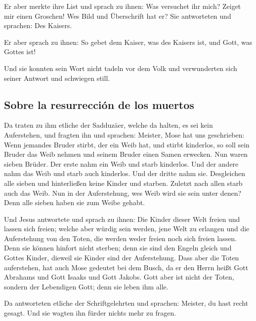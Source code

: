  Er aber merkte ihre List und sprach zu ihnen: Was
versuchet ihr mich?  Zeiget mir einen Groschen! Wes Bild
und Überschrift hat er? Sie antworteten und sprachen: Des Kaisers.

 Er aber sprach zu ihnen: So gebet dem Kaiser, was des
Kaisers ist, und Gott, was Gottes ist!

 Und sie konnten sein Wort nicht tadeln vor dem Volk und
verwunderten sich seiner Antwort und schwiegen still.

\hypertarget{sobre-la-resurrecciuxf3n-de-los-muertos}{%
\subsection{Sobre la resurrección de los
muertos}\label{sobre-la-resurrecciuxf3n-de-los-muertos}}

 Da traten zu ihm etliche der Sadduzäer, welche da
halten, es sei kein Auferstehen, und fragten ihn  und
sprachen: Meister, Mose hat uns geschrieben: Wenn jemandes Bruder
stirbt, der ein Weib hat, und stirbt kinderlos, so soll sein Bruder das
Weib nehmen und seinem Bruder einen Samen erwecken.  Nun
waren sieben Brüder. Der erste nahm ein Weib und starb kinderlos.
 Und der andere nahm das Weib und starb auch kinderlos.
 Und der dritte nahm sie. Desgleichen alle sieben und
hinterließen keine Kinder und starben.  Zuletzt nach
allen starb auch das Weib.  Nun in der Auferstehung, wes
Weib wird sie sein unter denen? Denn alle sieben haben sie zum Weibe
gehabt.

 Und Jesus antwortete und sprach zu ihnen: Die Kinder
dieser Welt freien und lassen sich freien;  welche aber
würdig sein werden, jene Welt zu erlangen und die Auferstehung von den
Toten, die werden weder freien noch sich freien lassen. 
Denn sie können hinfort nicht sterben; denn sie sind den Engeln gleich
und Gottes Kinder, dieweil sie Kinder sind der Auferstehung.
 Dass aber die Toten auferstehen, hat auch Mose gedeutet
bei dem Busch, da er den Herrn heißt Gott Abrahams und Gott Isaaks und
Gott Jakobs.  Gott aber ist nicht der Toten, sondern der
Lebendigen Gott; denn sie leben ihm alle.

 Da antworteten etliche der Schriftgelehrten und
sprachen: Meister, du hast recht gesagt.  Und sie wagten
ihn fürder nichts mehr zu fragen.

